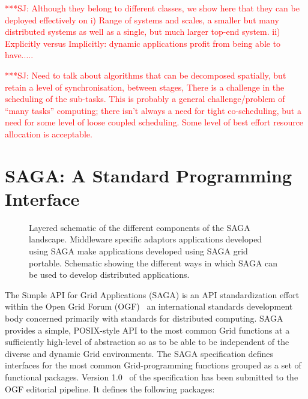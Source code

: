 \documentclass[conference,final]{IEEEtran}
\newcommand{\up}{\vspace*{-1em}}
\newcommand{\jhanote}[1]{ {\textcolor{red} { ***SJ: #1 }}}
\newcommand{\jhanote}[1]{}
\begin{document}
\jhanote{Although they belong to different classes, we show here that
  they can be deployed effectively on i) Range of systems and scales,
  a smaller but many distributed systems as well as a single, but much
  larger top-end system. ii) Explicitly versus Implicitly: dynamic
  applications profit from being able to have.....}

\jhanote{Need to talk about algorithms that can be decomposed
  spatially, but retain a level of synchronisation, between stages,
  There is a challenge in the scheduling of the sub-tasks.  This is
  probably a general challenge/problem of ``many tasks'' computing;
  there isn't always a need for tight co-scheduling, but a need for
  some level of loose coupled scheduling.  Some level of best effort
  resource allocation is acceptable.}

\up

\section{SAGA: A Standard Programming Interface}

\up

\begin{figure}[!h]
  \begin{center}
  \end{center}
  \caption{Layered schematic of the different components of the SAGA
    landscape.  Middleware specific adaptors applications developed
    using SAGA make applications developed using SAGA grid
    portable. Schematic showing the different ways in which SAGA can
    be used to develop distributed applications.\up}
 \label{sagalayer}
\end{figure}


The Simple API for Grid Applications (SAGA) is an API standardization
effort within the Open Grid Forum (OGF)~\cite{ogf_web} an
international standards development body concerned primarily with
standards for distributed computing.  SAGA provides a simple,
POSIX-style API to the most common Grid functions at a sufficiently
high-level of abstraction so as to be able to be independent of the
diverse and dynamic Grid environments.  The SAGA specification defines
interfaces for the most common Grid-programming functions grouped as a
set of functional packages.  Version 1.0~\cite{saga-core} of the
specification has been submitted to the OGF editorial pipeline.  It
defines the following packages:
\end{document}
